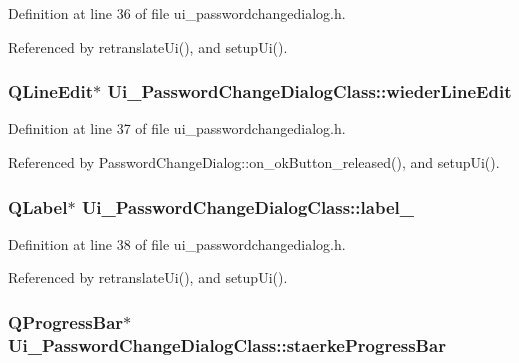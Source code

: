 Definition at line 36 of file ui\_\-passwordchangedialog.h.

Referenced by retranslateUi(), and setupUi().\hypertarget{class_ui___password_change_dialog_class_364db9f3e381caa97d43b4f902ebfdb5}{
\subsubsection[wiederLineEdit]{\setlength{\rightskip}{0pt plus 5cm}QLineEdit$\ast$ {\bf Ui\_\-PasswordChangeDialogClass::wiederLineEdit}}}
\label{class_ui___password_change_dialog_class_364db9f3e381caa97d43b4f902ebfdb5}




Definition at line 37 of file ui\_\-passwordchangedialog.h.

Referenced by PasswordChangeDialog::on\_\-okButton\_\-released(), and setupUi().\hypertarget{class_ui___password_change_dialog_class_3480bfcab84a0179f30f05f2b06efe35}{
\subsubsection[label\_\-4]{\setlength{\rightskip}{0pt plus 5cm}QLabel$\ast$ {\bf Ui\_\-PasswordChangeDialogClass::label\_}}}
\label{class_ui___password_change_dialog_class_3480bfcab84a0179f30f05f2b06efe35}




Definition at line 38 of file ui\_\-passwordchangedialog.h.

Referenced by retranslateUi(), and setupUi().\hypertarget{class_ui___password_change_dialog_class_e88142a3552424957b5d73ed445d824e}{
\subsubsection[staerkeProgressBar]{\setlength{\rightskip}{0pt plus 5cm}QProgressBar$\ast$ {\bf Ui\_\-PasswordChangeDialogClass::staerkeProgressBar}}}
\label{class_ui___password_change_dialog_class_e88142a3552424957b5d73ed445d824e}




